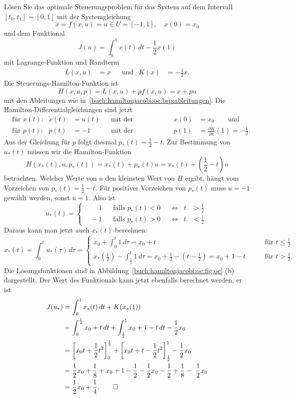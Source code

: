 \begin{beispiel}
\label{buch:hamiltonjacobi:oc:bsp:switch}
Lösen Sie das optimale Steuerungsproblem für das System auf dem Intervall
$[t_0,t_1]=[0,1]$ mit der Systemgleichung
\[
\dot{x} = f(x,u)=u\in U=[-1,1],\quad x(0) = x_0
\]
und dem Funktional
\[
J(u)
=
\int_0^1 x(t)\,dt -\frac12 x(1)
\]
mit Lagrange-Funktion und Randterm
\begin{align*}
L(x,u)
&=
x
&&\text{und}&
K(x)&=-\frac12x.
\end{align*}
Die Steuerungs-Hamilton-Funktion ist
\[
H(x,u,p)
=
L(x,u) + pf(x,u)
=
x + pu
\]
mit den Ableitungen wie in~\eqref{buch:hamiltonjacobi:oc:bsp:ableitungen}.
Die Hamilton-Differentialgleichungen sind jetzt
\begin{align*}
&\text{für $x(t)$:}&
\dot{x}(t)&=u(t)
&&\text{mit der Anfangsbedingung:}&
x(0)&=x_0\qquad\text{und}
\\
&\text{für $p(t)$:}&
\dot{p}(t)&=-1
&&\text{mit der Randbedingung:}&
p(1)&=\frac{\partial K}{\partial x}(1) = -\frac12.
\end{align*}
Aus der Gleichung für $p$ folgt diesmal $p_*(t)=\frac12-t$.
Zur Bestimmung von $u_*(t)$ müssen wir die Hamilton-Funktion
\[
H(x_*(t),u,p_*(t))
=
x_*(t)+p_*(t)u
=
x_*(t)+({\textstyle\frac12}-t)u
\]
betrachten.
Welcher Werte von $u$ den kleinsten Wert von $H$ ergibt, hängt
vom Vorzeichen von $p_*(t)=\frac12-t$.
Für positives Vorzeichen von $p_*(t)$ muss $u=-1$ gewählt werden,
sonst $u=1$.
Also ist
\[
u_*(t)
=
\left\{
\begin{aligned}
&\phantom{-}1&&\text{falls $p_*(t)<0$}&&\Leftrightarrow&t&>\textstyle\frac12
\\
&{}-1&&\text{falls $p_*(t)>0$}&&\Leftrightarrow&t&<\textstyle\frac12.
\end{aligned}
\right.
\]
Daraus kann man jetzt auch $x_*(t)$ berechnen:
\[
x_*(t)
=
\int_0^t u_*(\tau)\,d\tau
=
\begin{cases}
x_0+{\displaystyle\int_0^t 1\,d\tau} = x_0+t&\qquad\text{für $t\le\frac12$}
\\[8pt]
x_*(\frac12)-{\displaystyle\int_{\frac12}^t 1\,d\tau}
=
x_0+\frac12-(t-\frac12)
=
x_0+1-t&\qquad\text{für $t>\frac12$.}
\end{cases}
\]
Die Lösungsfunktionen sind in
Abbildung~\ref{buch:hamiltonjacobi:oc:fig:oc} (b)
dargestellt.
Der Wert des Funktionals kann jetzt ebenfalls berechnet werden, er ist
\begin{align*}
J(u_*)
&=
\int_0^1 x_*(t)\,dt + K(x_*(1))
\\
&=
\int_0^{\frac12} x_0+t \,dt
+
\int_{\frac12}^1 x_0+1-t\,dt
-
\frac12x_0
\\
&=
\biggl[x_0t+\frac12t^2\biggr]_0^{\frac12}
+
\biggl[x_0t+t-\frac12t^2\biggr]_{\frac12}^1 - \frac12x_0
\\
&=
\frac12x_0 + \frac18 + x_0+1-\frac12 - \frac12x_0-\frac12 +\frac18 - \frac12x_0
\\
&=\frac12x_0+\frac14.
\qedhere
\end{align*}
\end{beispiel}

